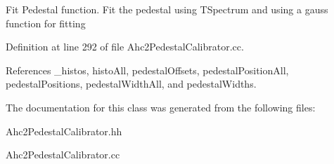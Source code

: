 Fit Pedestal function. Fit the pedestal using TSpectrum and using a gauss function for fitting 

Definition at line 292 of file Ahc2PedestalCalibrator.cc.

References \_\-histos, histoAll, pedestalOffsets, pedestalPositionAll, pedestalPositions, pedestalWidthAll, and pedestalWidths.

The documentation for this class was generated from the following files:\begin{DoxyCompactItemize}
\item 
Ahc2PedestalCalibrator.hh\item 
Ahc2PedestalCalibrator.cc\end{DoxyCompactItemize}
